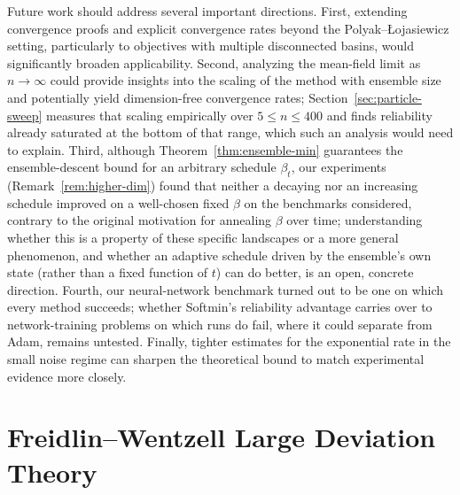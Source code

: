 \documentclass{article}
\theoremstyle{plain}
\theoremstyle{definition}
\theoremstyle{remark}
\begin{document}
Future work should address several important directions. First, extending convergence proofs and explicit convergence rates beyond the Polyak--\L{}ojasiewicz setting, particularly to objectives with multiple disconnected basins, would significantly broaden applicability. Second, analyzing the mean-field limit as $n \to \infty$ could provide insights into the scaling of the method with ensemble size and potentially yield dimension-free convergence rates; Section~\ref{sec:particle-sweep} measures that scaling empirically over $5\leq n\leq400$ and finds reliability already saturated at the bottom of that range, which such an analysis would need to explain. Third, although Theorem~\ref{thm:ensemble-min} guarantees the ensemble-descent bound for an arbitrary schedule $\beta_t$, our experiments (Remark~\ref{rem:higher-dim}) found that neither a decaying nor an increasing schedule improved on a well-chosen fixed $\beta$ on the benchmarks considered, contrary to the original motivation for annealing $\beta$ over time; understanding whether this is a property of these specific landscapes or a more general phenomenon, and whether an adaptive schedule driven by the ensemble's own state (rather than a fixed function of $t$) can do better, is an open, concrete direction. Fourth, our neural-network benchmark turned out to be one on which every method succeeds; whether Softmin's reliability advantage carries over to network-training problems on which runs do fail, where it could separate from Adam, remains untested. Finally, tighter estimates for the exponential rate in the small noise regime can sharpen the theoretical bound to match experimental evidence more closely.





\newpage
\appendix
\section{Freidlin--Wentzell Large Deviation Theory}
\label{apx:fw-theory}
\end{document}
